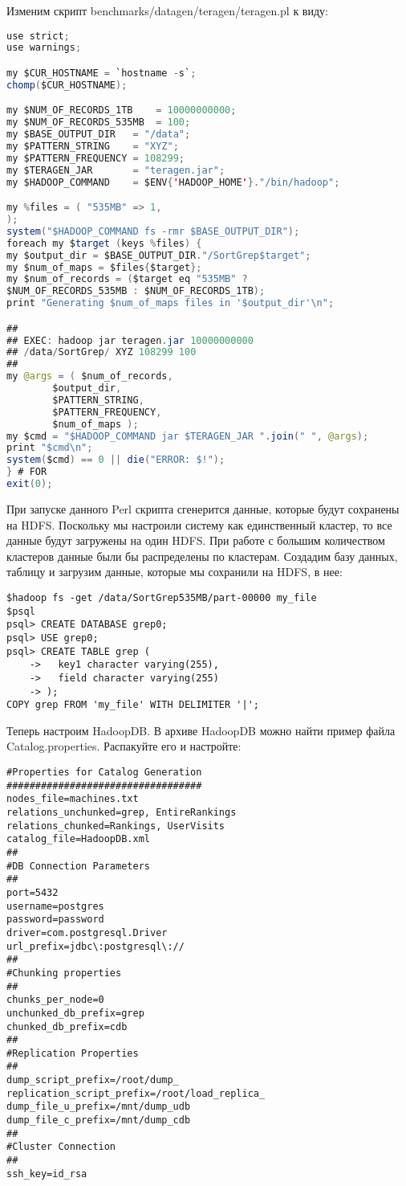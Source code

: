 Изменим скрипт benchmarks/datagen/teragen/teragen.pl к виду:
\begin{lstlisting}[language=Java,label=lst:haddop20,caption=Тестирование]
use strict;
use warnings;

my $CUR_HOSTNAME = `hostname -s`;
chomp($CUR_HOSTNAME);

my $NUM_OF_RECORDS_1TB    = 10000000000;
my $NUM_OF_RECORDS_535MB  = 100;
my $BASE_OUTPUT_DIR   = "/data";
my $PATTERN_STRING    = "XYZ";
my $PATTERN_FREQUENCY = 108299;
my $TERAGEN_JAR       = "teragen.jar";
my $HADOOP_COMMAND    = $ENV{'HADOOP_HOME'}."/bin/hadoop";

my %files = ( "535MB" => 1,
);
system("$HADOOP_COMMAND fs -rmr $BASE_OUTPUT_DIR");
foreach my $target (keys %files) {
my $output_dir = $BASE_OUTPUT_DIR."/SortGrep$target";
my $num_of_maps = $files{$target};
my $num_of_records = ($target eq "535MB" ?
$NUM_OF_RECORDS_535MB : $NUM_OF_RECORDS_1TB);
print "Generating $num_of_maps files in '$output_dir'\n";

##
## EXEC: hadoop jar teragen.jar 10000000000
## /data/SortGrep/ XYZ 108299 100
##
my @args = ( $num_of_records,
	    $output_dir,
	    $PATTERN_STRING,
	    $PATTERN_FREQUENCY,
	    $num_of_maps );
my $cmd = "$HADOOP_COMMAND jar $TERAGEN_JAR ".join(" ", @args);
print "$cmd\n";
system($cmd) == 0 || die("ERROR: $!");
} # FOR
exit(0);
\end{lstlisting}

При запуске данного Perl скрипта сгенерится данные, которые будут сохранены на HDFS.
Поскольку мы настроили систему как единственный кластер, то все данные будут загружены на один HDFS.
При работе с большим количеством кластеров данные были бы распределены по кластерам.
Создадим базу данных, таблицу и загрузим данные, которые мы сохранили на HDFS, в нее:
\begin{lstlisting}[label=lst:haddop21,caption=Тестирование]
$hadoop fs -get /data/SortGrep535MB/part-00000 my_file
$psql
psql> CREATE DATABASE grep0;
psql> USE grep0;
psql> CREATE TABLE grep (
    ->   key1 character varying(255),
    ->   field character varying(255)
    -> );
COPY grep FROM 'my_file' WITH DELIMITER '|';
\end{lstlisting}

Теперь настроим HadoopDB. В архиве HadoopDB можно найти пример файла Catalog.properties. Распакуйте его и настройте:
\begin{lstlisting}[label=lst:haddop22,caption=Тестирование]
#Properties for Catalog Generation
##################################
nodes_file=machines.txt
relations_unchunked=grep, EntireRankings
relations_chunked=Rankings, UserVisits
catalog_file=HadoopDB.xml
##
#DB Connection Parameters
##
port=5432
username=postgres
password=password
driver=com.postgresql.Driver
url_prefix=jdbc\:postgresql\://
##
#Chunking properties
##
chunks_per_node=0
unchunked_db_prefix=grep
chunked_db_prefix=cdb
##
#Replication Properties
##
dump_script_prefix=/root/dump_
replication_script_prefix=/root/load_replica_
dump_file_u_prefix=/mnt/dump_udb
dump_file_c_prefix=/mnt/dump_cdb
##
#Cluster Connection
##
ssh_key=id_rsa
\end{lstlisting}

